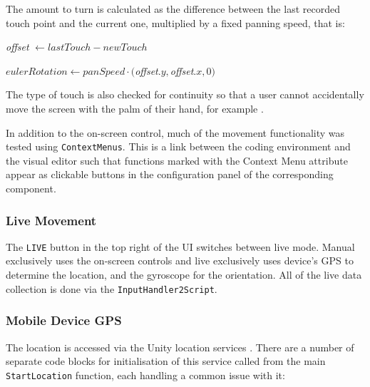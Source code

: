 \documentclass[12pt, a4paper]{article}
\begin{document}
The amount to turn is calculated as the difference between the last recorded touch point and the current one, multiplied by a fixed panning speed, that is:

\hspace{1cm} \textit{offset} $ \leftarrow lastTouch - newTouch$

\hspace{1cm} $eulerRotation \leftarrow panSpeed \cdot ($\textit{offset}$.y, $\textit{offset}$.x, 0)$

The type of touch is also checked for continuity so that a user cannot accidentally move the screen with the palm of their hand, for example \cite{movement:touchcontrol}. 

In addition to the on-screen control, much of the movement functionality was tested using \verb|ContextMenus|. This is a link between the coding environment and the visual editor such that functions marked with the Context Menu attribute appear as clickable buttons in the configuration panel of the corresponding component.

\subsubsection{Live Movement}
The \verb|LIVE| button in the top right of the UI switches between \gls{live} mode. Manual exclusively uses the on-screen controls and live exclusively uses device's GPS to determine the location, and the gyroscope for the orientation. All of the live data collection is done via the \verb|InputHandler2Script|. 

\subsubsection{Mobile Device GPS}
The location is accessed via the Unity location services \cite{movement:locationservice}. There are a number of separate code blocks for initialisation of this service called from the main \verb|StartLocation| function, each handling a common issue with it:
\end{document}
